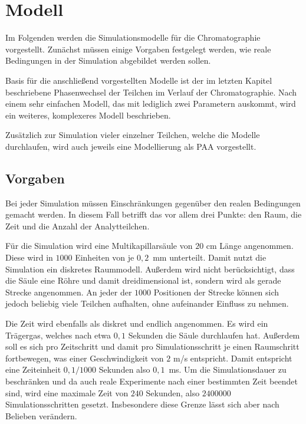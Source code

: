 \chapter{Modell} %
\label{chapter:mod}
Im Folgenden werden die Simulationsmodelle für die Chromatographie vorgestellt. 
Zunächst müssen einige Vorgaben festgelegt werden, wie reale Bedingungen in der Simulation abgebildet werden sollen.

Basis für die anschließend vorgestellten Modelle ist der im letzten Kapitel beschriebene Phasenwechsel der Teilchen im Verlauf der Chromatographie. Nach einem sehr einfachen Modell, das mit lediglich zwei Parametern auskommt, wird ein weiteres, komplexeres Modell beschrieben.

Zusätzlich zur Simulation vieler einzelner Teilchen, welche die Modelle durchlaufen, wird auch jeweils eine Modellierung als PAA vorgestellt.

\section{Vorgaben}
Bei jeder Simulation müssen Einschränkungen gegenüber den realen Bedingungen gemacht werden. In diesem Fall betrifft das vor allem drei Punkte: den Raum, die Zeit und die Anzahl der Analytteilchen.

Für die Simulation wird eine Multikapillarsäule von $20$ cm Länge angenommen. Diese wird in $1000$ Einheiten von je $0,2$\, mm unterteilt. Damit nutzt die Simulation ein diskretes Raummodell. Außerdem wird nicht berücksichtigt, dass die Säule eine Röhre und damit dreidimensional ist, sondern wird als gerade Strecke angenommen. An jeder der $1000$ Positionen der Strecke können sich jedoch beliebig viele Teilchen aufhalten, ohne aufeinander Einfluss zu nehmen.

Die Zeit wird ebenfalls als diskret und endlich angenommen. Es wird ein Trägergas, welches nach etwa $0,1$ Sekunden die Säule durchlaufen hat. Außerdem soll es sich pro Zeitschritt und damit pro Simulationsschritt je einen Raumschritt fortbewegen, was einer Geschwindigkeit von $2$ m/s entspricht. Damit entspricht eine Zeiteinheit $0,1/1000$ Sekunden also $0,1$\, ms. Um die Simulationsdauer zu beschränken und da auch reale Experimente nach einer bestimmten Zeit beendet sind, wird eine maximale Zeit von $240$ Sekunden, also $2400000$ Simulationsschritten gesetzt. Insbesondere diese Grenze lässt sich aber nach Belieben verändern.

